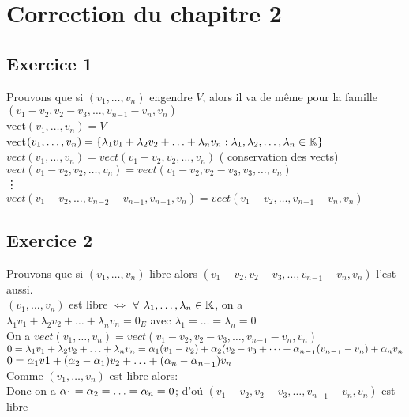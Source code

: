 \documentclass[12pt]{book}
\begin{document}
\section*{Correction du chapitre 2}

\subsection*{Exercice 1}
Prouvons que si $(v_1,\ldots,v_n)$ engendre $V$, alors il va de m\^eme pour la famille $(v_1-v_2,v_2-v_3,\ldots,v_n{_-}_1-v_n,v_n)$\\

\noindent
vect$(v_1,\ldots,v_n) = V$\\
vect$(v_1,\ldots,v_n) = \{ \lambda_1v_1+ \lambda_2v_2 +\ldots+ \lambda_nv_n : \lambda_1, \lambda_2,\ldots, \lambda_n \in \mathbb{K} \}$\\
$vect(v_1,\ldots,v_n) = vect(v_1-v_2,v_2,\ldots,v_n)$ ( conservation des vects)\\
$vect(v_1-v_2,v_2,\ldots,v_n) = vect(v_1-v_2,v_2-v_3,v_3,\ldots,v_n)$\\
\vdots\\
\noindent
$vect(v_1-v_2,\ldots,v_n{_-}_2-v_n{_-}_1,v_n{_-}_1,v_n) = vect(v_1-v_2,\ldots,v_n{_-}_1-v_n,v_n)$\\

\subsection*{Exercice 2}
Prouvons que si $(v_1,\ldots,v_n)$ libre alors $(v_1-v_2,v_2-v_3,\ldots,v_n{_-}_1-v_n,v_n)$ l'est aussi.\\

$(v_1,\ldots,v_n)$ est libre $\Leftrightarrow$ $\forall$ $\lambda_1,\ldots,\lambda_n \in \mathbb{K}$, on a \\
$\lambda_1v_1+ \lambda_2v_2 +\ldots+ \lambda_nv_n = 0_E$ avec $\lambda_1 =\ldots = \lambda_n = 0$\\
On a $vect(v_1,\ldots,v_n) = vect(v_1-v_2,v_2-v_3,\ldots,v_n{_-}_1-v_n,v_n)$\\
$0 = \lambda_1v_1+ \lambda_2v_2 +\ldots+ \lambda_nv_n = \alpha_1(v_1-v_2) + \alpha_2(v_2-v_3 +\dots+ \alpha_n{_-}_1(v_n{_-}_1-v_n) + \alpha_nv_n $\\
$0 = \alpha_1v1 + (\alpha_2-\alpha_1)v_2 +\ldots+ (\alpha_n-\alpha_n{_-}_1)v_n$\\
Comme $(v_1,\ldots,v_n)$ est libre alors: 
\\
Donc on a $\alpha_1 = \alpha_2 = \ldots= \alpha_n = 0$;
d'o\'u 
$(v_1-v_2,v_2-v_3,\ldots,v_n{_-}_1-v_n,v_n)$ est libre
\end{document}

